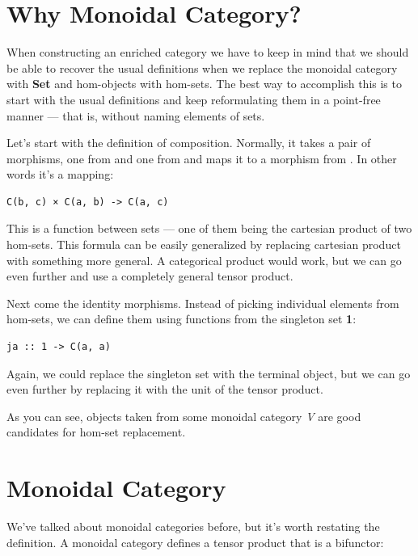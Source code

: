 \section{Why Monoidal Category?}\label{why-monoidal-category}

When constructing an enriched category we have to keep in mind that we
should be able to recover the usual definitions when we replace the
monoidal category with \textbf{Set} and hom-objects with hom-sets. The
best way to accomplish this is to start with the usual definitions and
keep reformulating them in a point-free manner --- that is, without
naming elements of sets.

Let's start with the definition of composition. Normally, it takes a
pair of morphisms, one from  and one from
 and maps it to a morphism from . In
other words it's a mapping:

\begin{verbatim}
C(b, c) × C(a, b) -> C(a, c)
\end{verbatim}

This is a function between sets --- one of them being the cartesian
product of two hom-sets. This formula can be easily generalized by
replacing cartesian product with something more general. A categorical
product would work, but we can go even further and use a completely
general tensor product.

Next come the identity morphisms. Instead of picking individual elements
from hom-sets, we can define them using functions from the singleton set
\textbf{1}:

\begin{verbatim}
ja :: 1 -> C(a, a)
\end{verbatim}

Again, we could replace the singleton set with the terminal object, but
we can go even further by replacing it with the unit  of the
tensor product.

As you can see, objects taken from some monoidal category \emph{V} are
good candidates for hom-set replacement.

\section{Monoidal Category}\label{monoidal-category}

We've talked about monoidal categories before, but it's worth restating
the definition. A monoidal category defines a tensor product that is a
bifunctor:

